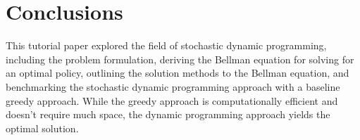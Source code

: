 \documentclass[conference]{IEEEtran}
\begin{document}
\section{Conclusions}

This tutorial paper explored the field of stochastic dynamic programming, including the problem formulation, deriving the Bellman equation for solving for an optimal policy, outlining the solution methods to the Bellman equation, and benchmarking the stochastic dynamic programming approach with a baseline greedy approach. While the greedy approach is computationally efficient and doesn't require much space, the dynamic programming approach yields the optimal solution.




\cleardoublepage %

\end{document}
